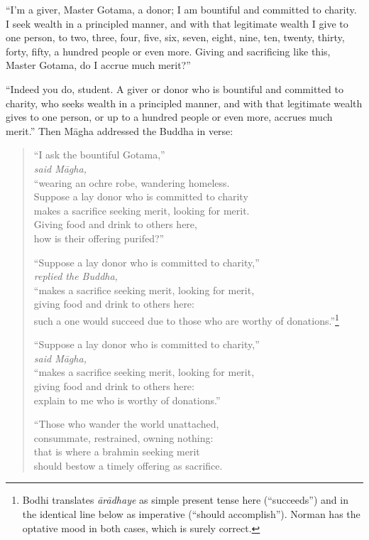 \documentclass[12pt,openany]{book}%
\newcommand*{\scspeaker}[1]{\hspace{2em}\textit{#1}}
\begin{document}
“I’m a giver, Master Gotama, a donor; I am bountiful and committed to charity. I seek wealth in a principled manner, and with that legitimate wealth I give to one person, to two, three, four, five, six, seven, eight, nine, ten, twenty, thirty, forty, fifty, a hundred people or even more. Giving and sacrificing like this, Master Gotama, do I accrue much merit?” 

“Indeed you do, student. A giver or donor who is bountiful and committed to charity, who seeks wealth in a principled manner, and with that legitimate wealth gives to one person, or up to a hundred people or even more, accrues much merit.” Then \textsanskrit{Māgha} addressed the Buddha in verse: 

\begin{verse}%
“I ask the bountiful Gotama,” \\
\scspeaker{said \textsanskrit{Māgha}, }\\
“wearing an ochre robe, wandering homeless. \\
Suppose a lay donor who is committed to charity \\
makes a sacrifice seeking merit, looking for merit. \\
Giving food and drink to others here, \\
how is their offering purifed?” 

“Suppose a lay donor who is committed to charity,” \\
\scspeaker{replied the Buddha, }\\
“makes a sacrifice seeking merit, looking for merit, \\
giving food and drink to others here: \\
such a one would succeed due to those who are worthy of donations.”\footnote{Bodhi translates \textit{\textsanskrit{ārādhaye}} as simple present tense here (“succeeds”) and in the identical line below as imperative (“should accomplish”). Norman has the optative mood in both cases, which is surely correct. } 

“Suppose a lay donor who is committed to charity,” \\
\scspeaker{said \textsanskrit{Māgha}, }\\
“makes a sacrifice seeking merit, looking for merit, \\
giving food and drink to others here: \\
explain to me who is worthy of donations.” 

“Those who wander the world unattached, \\
consummate, restrained, owning nothing: \\
that is where a brahmin seeking merit \\
should bestow a timely offering as sacrifice. 


\end{verse}
\end{document}
